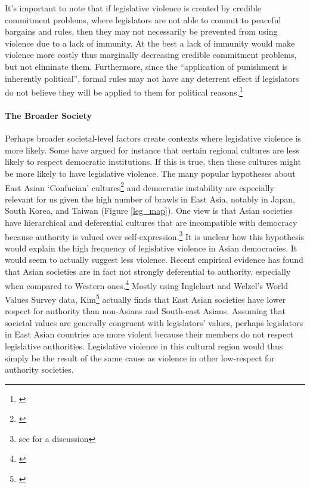 \documentclass[a4paper]{article}\usepackage[]{graphicx}\usepackage[]{color}
\begin{document}
It's important to note that if legislative violence is created by credible commitment problems, where legislators are not able to commit to peaceful bargains and rules, then they may not necessarily be prevented from using violence due to a lack of immunity. At the best a lack of immunity would make violence more costly thus marginally decreasing credible commitment problems, but not eliminate them. Furthermore, since the ``application of punishment is inherently political'', formal rules may not have any deterrent effect if legislators do not believe they will be applied to them for political reasons.\footnote{\citealt[58]{Wolfe2004}}

\paragraph{The Broader Society}

Perhaps broader societal-level factors create contexts where legislative violence is more likely. Some have argued for instance that certain regional cultures are less likely to respect democratic institutions. If this is true, then these cultures might be more likely to have legislative violence. The many popular hypotheses about East Asian `Confucian' cultures\footnote{\citealt{Inglehart2005, Inglehart2010}} and democratic instability are especially relevant for us given the high number of brawls in East Asia, notably in Japan, South Korea, and Taiwan (Figure \ref{leg_map}). One view is that Asian societies have hierarchical and deferential cultures that are incompatible with democracy because authority is valued over self-expression.\footnote{see \citealt[212-213]{Dalton2005} for a discussion} It is unclear how this hypothesis would explain the high frequency of legislative violence in Asian democracies. It would seem to actually suggest less violence. Recent empirical evidence has found that Asian societies are in fact not strongly deferential to authority, especially when compared to Western ones.\footnote{\citealt{Dalton2005, KimAsianValues2010}} Mostly using Inglehart and Welzel's World Values Survey data, Kim\footnote{\citealt{KimAsianValues2010}} actually finds that East Asian societies have lower respect for authority than non-Asians and South-east Asians. Assuming that societal values are generally congruent with legislators' values, perhaps legislators in East Asian countries are more violent because their members do not respect legislative authorities. Legislative violence in this cultural region would thus simply be the result of the same cause as violence in other low-respect for authority societies.
\end{document}
